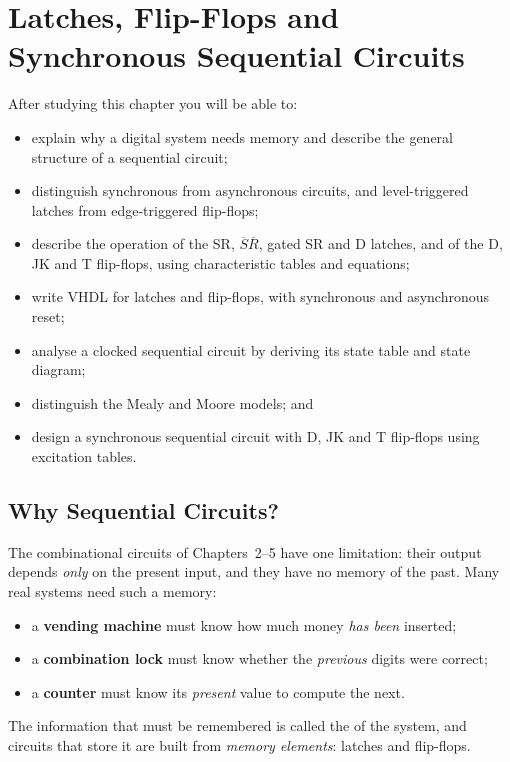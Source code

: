 \chapter{Latches, Flip-Flops and Synchronous Sequential Circuits}\label{ch:latches}

\begin{objectives}
After studying this chapter you will be able to:
\begin{itemize}
  \item explain why a digital system needs memory and describe the general structure of a sequential circuit;
  \item distinguish synchronous from asynchronous circuits, and level-triggered latches from edge-triggered flip-flops;
  \item describe the operation of the SR, $\overline{S}\overline{R}$, gated SR and D latches, and of the D, JK and T flip-flops, using characteristic tables and equations;
  \item write VHDL for latches and flip-flops, with synchronous and asynchronous reset;
  \item analyse a clocked sequential circuit by deriving its state table and state diagram;
  \item distinguish the Mealy and Moore models; and
  \item design a synchronous sequential circuit with D, JK and T flip-flops using excitation tables.
\end{itemize}
\end{objectives}

\section{Why Sequential Circuits?}
The combinational circuits of Chapters~2--5 have one limitation: their output depends \emph{only} on the present input, and they have no memory of the past. Many real systems need such a memory:
\begin{itemize}
  \item a \textbf{vending machine} must know how much money \emph{has been} inserted;
  \item a \textbf{combination lock} must know whether the \emph{previous} digits were correct;
  \item a \textbf{counter} must know its \emph{present} value to compute the next.
\end{itemize}
The information that must be remembered is called the  of the system, and circuits that store it are built from \emph{memory elements}: latches and flip-flops.

